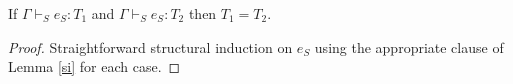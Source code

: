 \begin{suot}
\label{suot}
If $\Gamma\vdash_{S}e_{S}:T_{1}$ and $\Gamma\vdash_{S}e_{S}:T_{2}$ then $T_{1}=T_{2}$.
\begin{proof}
Straightforward structural induction on $e_{S}$ using the appropriate clause of Lemma \ref{si} for each case.
\end{proof}
\end{suot}